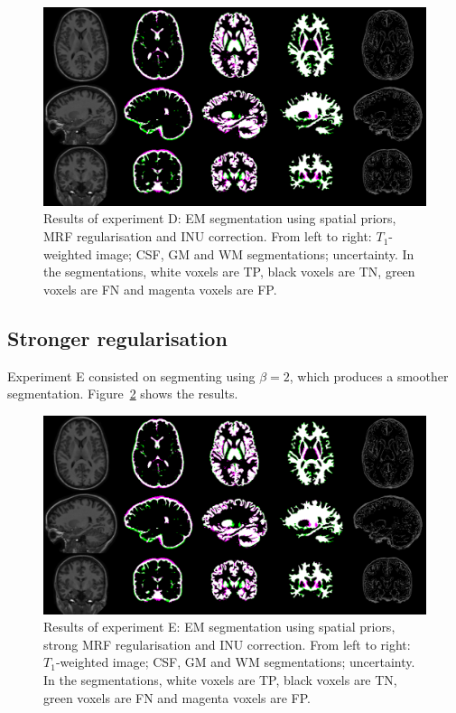 \begin{figure}
  \centering
  \includegraphics[width=\textwidth]{figures/experiment_b}
  \caption{Results of experiment D: EM segmentation using spatial priors, MRF regularisation and INU correction. From left to right: $T_1$-weighted image; CSF, GM and WM segmentations; uncertainty. In the segmentations, white voxels are TP, black voxels are TN, green voxels are FN and magenta voxels are FP.}
  \label{fig:experiment-d}
\end{figure}


\subsection{Stronger regularisation}
Experiment E consisted on segmenting using $\beta = 2$, which produces a smoother segmentation. Figure~\ref{fig:experiment-e} shows the results.

\begin{figure}
  \centering
  \includegraphics[width=\textwidth]{figures/experiment_b}
  \caption{Results of experiment E: EM segmentation using spatial priors, strong MRF regularisation and INU correction. From left to right: $T_1$-weighted image; CSF, GM and WM segmentations; uncertainty. In the segmentations, white voxels are TP, black voxels are TN, green voxels are FN and magenta voxels are FP.}
  \label{fig:experiment-e}
\end{figure}



